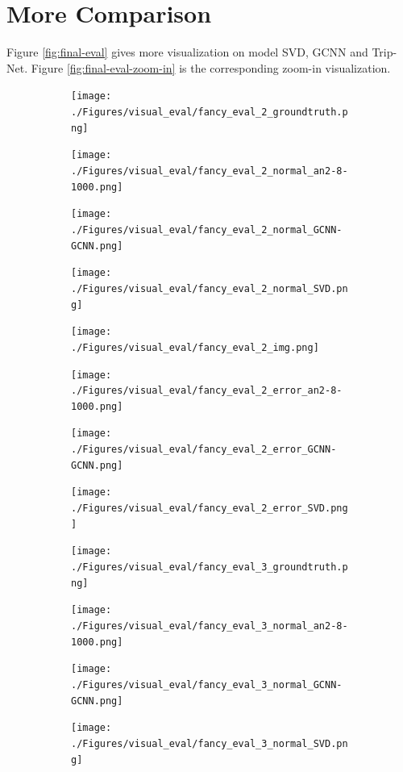 \documentclass[border=15pt, multi, tikz]{article}
\begin{document}
\section{More Comparison}
Figure \ref{fig:final-eval} gives more visualization on model SVD, GCNN and Trip-Net. Figure \ref{fig:final-eval-zoom-in} is the corresponding zoom-in visualization.
\newpage
\begin{figure}
	\centering
	\begin{subfigure}[b]{0.24\linewidth}
		\texttt{[image: ./Figures/visual\_eval/fancy\_eval\_2\_groundtruth.png]}
	\end{subfigure}
	\begin{subfigure}[b]{0.24\linewidth}
		\texttt{[image: ./Figures/visual\_eval/fancy\_eval\_2\_normal\_an2-8-1000.png]}
	\end{subfigure}
	\begin{subfigure}[b]{0.24\linewidth}
		\texttt{[image: ./Figures/visual\_eval/fancy\_eval\_2\_normal\_GCNN-GCNN.png]}
	\end{subfigure}
	\begin{subfigure}[b]{0.24\linewidth}
		\texttt{[image: ./Figures/visual\_eval/fancy\_eval\_2\_normal\_SVD.png]}
	\end{subfigure}
	
	\begin{subfigure}[b]{0.24\linewidth}
		\texttt{[image: ./Figures/visual\_eval/fancy\_eval\_2\_img.png]}
	\end{subfigure}
	\begin{subfigure}[b]{0.24\linewidth}
		\texttt{[image: ./Figures/visual\_eval/fancy\_eval\_2\_error\_an2-8-1000.png]}
	\end{subfigure}
	\begin{subfigure}[b]{0.24\linewidth}
		\texttt{[image: ./Figures/visual\_eval/fancy\_eval\_2\_error\_GCNN-GCNN.png]}
	\end{subfigure}
	\begin{subfigure}[b]{0.24\linewidth}
		\texttt{[image: ./Figures/visual\_eval/fancy\_eval\_2\_error\_SVD.png]}
	\end{subfigure}
	
	\begin{subfigure}[b]{0.24\linewidth}
		\texttt{[image: ./Figures/visual\_eval/fancy\_eval\_3\_groundtruth.png]}
	\end{subfigure}
	\begin{subfigure}[b]{0.24\linewidth}
		\texttt{[image: ./Figures/visual\_eval/fancy\_eval\_3\_normal\_an2-8-1000.png]}
	\end{subfigure}
	\begin{subfigure}[b]{0.24\linewidth}
		\texttt{[image: ./Figures/visual\_eval/fancy\_eval\_3\_normal\_GCNN-GCNN.png]}
	\end{subfigure}
	\begin{subfigure}[b]{0.24\linewidth}
		\texttt{[image: ./Figures/visual\_eval/fancy\_eval\_3\_normal\_SVD.png]}
	\end{subfigure}
	

\end{figure}
\end{document}
